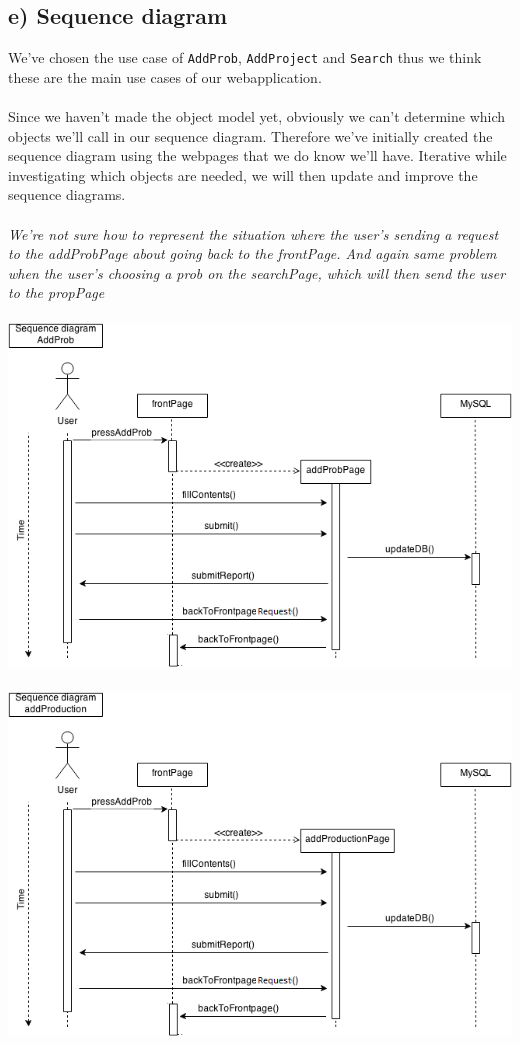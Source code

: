 \documentclass[12pt]{article}
\begin{document}
\subsection*{e) Sequence diagram}
We've chosen the use case of \texttt{AddProb}, \texttt{AddProject} and \texttt{Search} thus we think these are the main use cases of our webapplication.\\\\
Since we haven't made the object model yet, obviously we can't determine which objects we'll call in our sequence diagram. Therefore we've initially created the sequence diagram using the webpages that we do know we'll have. Iterative while investigating which objects are needed, we will then update and improve the sequence diagrams.\\\\
\textit{We're not sure how to represent the situation where the user's sending a request to the addProbPage about going back to the frontPage. And again same problem when the user's choosing a prob on the searchPage, which will then send the user to the propPage}\\\\
\includegraphics[scale=0.6]{sequenceDiagram_addProb.png}\\\\
\includegraphics[scale=0.6]{sequenceDiagram_addProduction.png}\\\\
\end{document}
